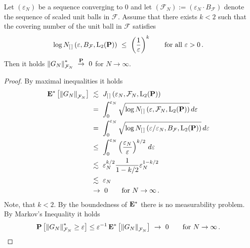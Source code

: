\begin{lemma}
  Let $(\varepsilon_N)$ be a sequence converging to 0
  and let 
  $
  \left( 
    \mathcal{F}_N
  \right)
    :=
    \left( 
    \varepsilon_N\cdot B_\mathcal{F}
    \right)
  $
  denote the sequence of scaled unit balls in $\mathcal{F}$.
  Assume that 
  there exists
  $k<2$ such that 
  the covering number of the unit ball in $\mathcal{F}$
  satisfies
  \begin{gather}
        \log 
      N_{[\,]}
\left( \varepsilon, B_\mathcal{F},\mathrm{L}_2(\P) \right)
\ 
\le
\ 
\left( \frac{1}{\varepsilon} \right)^k
\qquad
\text{for all}\ 
\varepsilon>0
\,.
  \end{gather}
  Then it holds
  $
      \norm{G_N}^*_{\mathcal{F}_N}
    \ 
    \overset{\P}
    {\to}
    \ 
    0
  $
  for $N\to \infty$. 
\end{lemma}
\begin{proof}
  By maximal inequalities it holds
  \begin{align*}
    \E^*
    \left[ 
      \norm{G_N}_{\mathcal{F}_N}
    \right]
    &
      \ 
      \lesssim
      \ 
      J_{[\,]}\left( \varepsilon_N, \mathcal{F}_N,\mathrm{L}_2(\P) \right)
      \\
    &
      \ 
      =
      \ 
      \int_0^{\varepsilon_N}
      \sqrt{
        \log 
      N_{[\,]}
\left( \varepsilon, \mathcal{F}_N,\mathrm{L}_2(\P) \right)
    }
    \,
    d\varepsilon
    \\
    &
    \ 
    =
    \ 
      \int_0^{\varepsilon_N}
      \sqrt{\log 
      N_{[\,]}
\left( \varepsilon/\varepsilon_N, B_\mathcal{F},\mathrm{L}_2(\P) \right)
    }
    \,
    d\varepsilon
    \\
    &
    \ 
    \le
    \ 
      \int_0^{\varepsilon_N}
      \left( 
      \frac{\varepsilon_N}{\varepsilon}
    \right)^{k/2}
    \,
    d\varepsilon
    \\
    &
    \ 
    \lesssim
    \ 
  \varepsilon_N^{k/2}
  \frac{1}{1-k/2}
  \varepsilon_N^{1-k/2}
  \\
    &
    \ 
  \lesssim
    \ 
  \varepsilon_N
  \\
    &
    \ 
  \to
  \ 
  0
  \qquad
  \text{for}\ 
  N\to
  \infty
  \,.
  \end{align*}
  Note, that $k<2$.
  By the boundedness of $\mathbf{E}^*$ there is no measurability problem.
  By Markov's Inequality it holds
  \begin{align*}
    \P
    \left[ 
      \norm{G_N}^*_{\mathcal{F}_N}\ge \varepsilon
    \right]
    \le
    \varepsilon^{-1}
    \,
    \E^*
    \left[ 
      \norm{G_N}_{\mathcal{F}_N}
    \right]
    \ 
    \to
    \ 
    0
    \qquad
    \text{for}\ 
    N\to\infty
    \,.
  \end{align*}
\end{proof}
